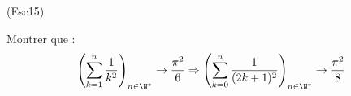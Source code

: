\begin{tiny}(Esc15)\end{tiny} Montrer que :
\begin{displaymath}
 \left(\sum_{k=1}^n\frac{1}{k^2} \right)_{n\in\N^*}\rightarrow \frac{\pi^2}{6}
\Rightarrow
 \left(\sum_{k=0}^n\frac{1}{(2k+1)^2} \right)_{n\in\N^*}\rightarrow \frac{\pi^2}{8}
\end{displaymath}
